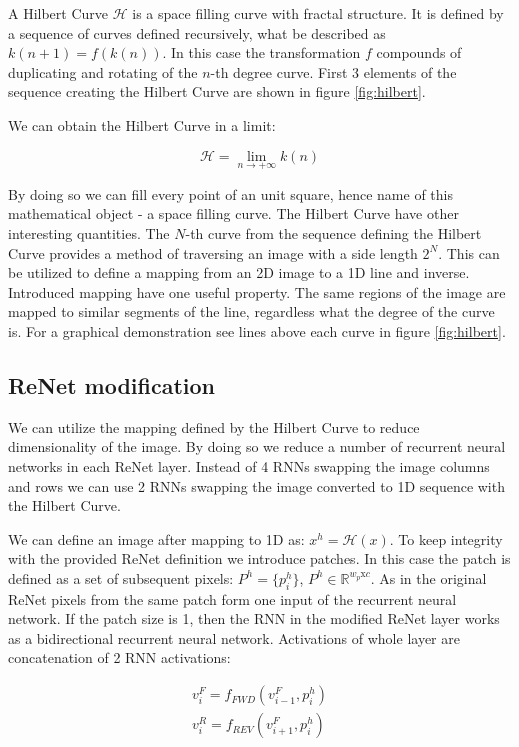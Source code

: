 \documentclass[a4paper, 10 pt, journal]{ieeeconf}
\begin{document}
A Hilbert Curve $\mathcal{H}$ is a space filling curve with fractal structure. It is defined by a sequence of curves defined recursively, what be described as $k(n+1) = f(k(n))$. In this case the transformation $f$ compounds of duplicating and rotating of the $n$-th degree curve. First 3 elements of the sequence creating the Hilbert Curve are shown in figure \ref{fig:hilbert}.

We can obtain the Hilbert Curve in a limit:

\begin{equation}
	\mathcal{H} = \lim_{n \rightarrow + \infty } k(n)
\end{equation}

By doing so we can fill every point of an unit square, hence name of this mathematical object - a space filling curve. The Hilbert Curve have other interesting quantities. The $N$-th curve from the sequence defining the Hilbert Curve provides a method of traversing an image with a side length $2^{N}$. This can be utilized to define a mapping from an 2D image to a 1D line and inverse. Introduced mapping have one useful property. The same regions of the image are mapped to similar segments of the line, regardless what the degree of the curve is. For a graphical demonstration see lines above each curve in figure \ref{fig:hilbert}.

\subsection{ReNet modification}

We can utilize the mapping defined by the Hilbert Curve to reduce dimensionality of the image. By doing so we reduce a number of recurrent neural networks in each ReNet layer. Instead of 4 RNNs swapping the image columns and rows we can use 2 RNNs swapping the image converted to 1D sequence with the Hilbert Curve.

We can define an image after mapping to 1D as: $x^{h} = \mathcal{H}(x)$. To keep integrity with the provided ReNet definition we introduce patches. In this case the patch is defined as a set of subsequent pixels: $P^{h} = \{ p_{i}^h \}$, $P^{h} \in \mathbb{R}^{w_p \textrm{x} c}$. As in the original ReNet pixels from the same patch form one input of the recurrent neural network. If the patch size is 1, then the RNN in the modified ReNet layer works as a bidirectional recurrent neural network. Activations of whole layer are concatenation of 2 RNN activations:

\begin{gather}
	v_{i}^{F} = f_{FWD}(v_{i-1}^{F}, p_{i}^{h}) \\
	v_{i}^{R} = f_{REV}(v_{i+1}^{F}, p_{i}^{h})
\end{gather}
\end{document}
